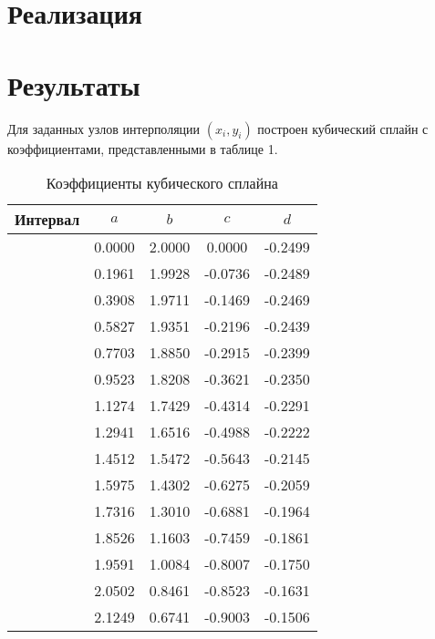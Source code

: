 \documentclass[a4paper, 14pt]{extarticle}
\begin{document}
\section{Реализация}






\section{Результаты}
Для заданных узлов интерполяции \((x_i, y_i)\) построен кубический
сплайн с коэффициентами, представленными в таблице 1.

\begin{table}[h!]
\centering
\caption{Коэффициенты кубического сплайна}
\begin{tabular}{|c|c|c|c|c|}
\hline
Интервал & \(a\) & \(b\) & \(c\) & \(d\) \\ \hline
[0.0000, 0.0982] & 0.0000 & 2.0000 & 0.0000 & -0.2499 \\ \hline
[0.0982, 0.1963] & 0.1961 & 1.9928 & -0.0736 & -0.2489 \\ \hline
[0.1963, 0.2945] & 0.3908 & 1.9711 & -0.1469 & -0.2469 \\ \hline
[0.2945, 0.3927] & 0.5827 & 1.9351 & -0.2196 & -0.2439 \\ \hline
[0.3927, 0.4909] & 0.7703 & 1.8850 & -0.2915 & -0.2399 \\ \hline
[0.4909, 0.5890] & 0.9523 & 1.8208 & -0.3621 & -0.2350 \\ \hline
[0.5890, 0.6872] & 1.1274 & 1.7429 & -0.4314 & -0.2291 \\ \hline
[0.6872, 0.7854] & 1.2941 & 1.6516 & -0.4988 & -0.2222 \\ \hline
[0.7854, 0.8836] & 1.4512 & 1.5472 & -0.5643 & -0.2145 \\ \hline
[0.8836, 0.9817] & 1.5975 & 1.4302 & -0.6275 & -0.2059 \\ \hline
[0.9817, 1.0799] & 1.7316 & 1.3010 & -0.6881 & -0.1964 \\ \hline
[1.0799, 1.1781] & 1.8526 & 1.1603 & -0.7459 & -0.1861 \\ \hline
[1.1781, 1.2763] & 1.9591 & 1.0084 & -0.8007 & -0.1750 \\ \hline
[1.2763, 1.3744] & 2.0502 & 0.8461 & -0.8523 & -0.1631 \\ \hline
[1.3744, 1.4726] & 2.1249 & 0.6741 & -0.9003 & -0.1506 \\ \hline

\end{tabular}
\end{table}
\end{document}
